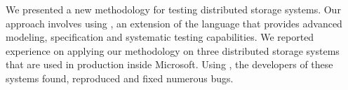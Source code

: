 We presented a new methodology for testing distributed storage systems. Our approach involves using \psharp, an extension of the \csharp language that provides advanced modeling, specification and systematic testing capabilities. We reported experience on applying our methodology on three distributed storage systems that are used in production inside Microsoft. Using \psharp, the developers of these systems found, reproduced and fixed numerous bugs.